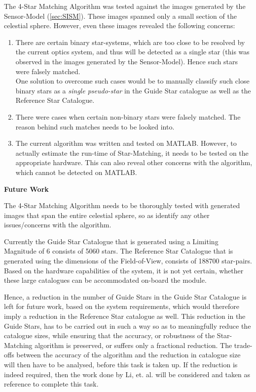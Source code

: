 \documentclass[../../main.tex]{subfiles}
\begin{document}
The 4-Star Matching Algorithm was tested against the images generated by the Sensor-Model (\ref{sec:SISM}). These images spanned only a small section of the celestial sphere. However, even these images revealed the following concerns:
\begin{enumerate}
    \item There are certain binary star-systems, which are too close to be resolved by the current optics system, and thus will be detected as a single star (this was observed in the images generated by the Sensor-Model). Hence such stars were falsely matched. \\
    One solution to overcome such cases would be to manually classify such close binary stars as a \textit{single pseudo-star} in the Guide Star catalogue as well as the Reference Star Catalogue.
    
    \item There were cases when certain non-binary stars were falsely matched. The reason behind such matches needs to be looked into.
    
    \item The current algorithm was written and tested on MATLAB. However, to actually estimate  the run-time of Star-Matching, it needs to be tested on the appropriate hardware. This can also reveal other concerns with the algorithm, which cannot be detected on MATLAB.
\end{enumerate}

\textbf{Future Work}

The 4-Star Matching Algorithm needs to be thoroughly tested with generated images that span the entire celestial sphere, so as identify any other issues/concerns with the algorithm.

Currently the Guide Star Catalogue that is generated using a Limiting Magnitude of 6 consists of 5060 stars. The Reference Star Catalogue that is generated using the dimensions of the Field-of-View, consists of 188700 star-pairs. 
Based on the hardware capabilities of the system, it is not yet certain, whether these large catalogues can be accommodated on-board the module.

Hence, a reduction in the number of Guide Stars in the Guide Star Catalogue is left for future work, based on the system requirements, which would therefore imply a reduction in the Reference Star catalogue as well.
This reduction in the Guide Stars, has to be carried out in such a way so as to meaningfully reduce the catalogue sizes, while ensuring that the accuracy, or robustness of the Star-Matching algorithm is preserved, or suffers only a fractional reduction. The trade-offs between the accuracy of the algorithm and the reduction in catalogue size will then have to be analysed, before this task is taken up.
If the reduction is indeed required, then the work done by Li, et. al. \cite{li2014new} will be considered and taken as reference to complete this task.

\end{document}
